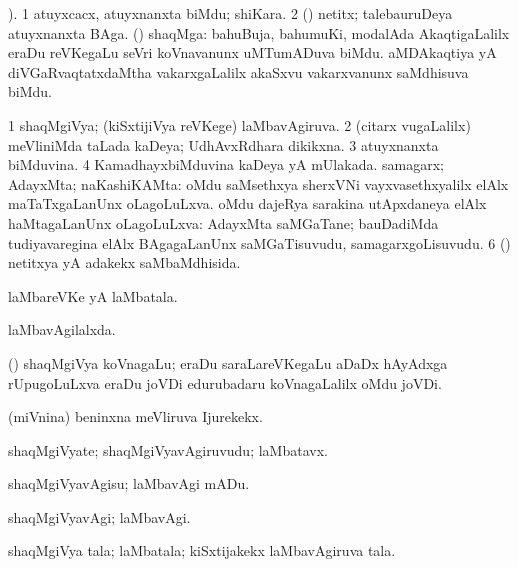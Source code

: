 \bentry
{} 
\gl{\nA}
). \bmng
\bnum
\num{1} atuyxcacx, atuyxnanxta biMdu; shiKara. 
\num{2} (\aMrashA) netitx; talebauruDeya atuyxnanxta BAga. 
 (\jAyx) shaqMga: 
\banum
{} bahuBuja, bahumuKi, modalAda AkaqtigaLalilx eraDu reVKegaLu seVri koVnavanunx uMTumADuva biMdu. 
 aMDAkaqtiya yA diVGaRvaqtatxdaMtha vakarxgaLalilx akaSxvu vakarxvanunx saMdhisuva biMdu. 
\eanum
\numie
\enum
\emng
\eentry

\bentry
{} 
\gl{\gu}
\expl{}
\bmng
\bnum
\num{1} shaqMgiVya; (kiSxtijiVya reVKege) laMbavAgiruva. 
\num{2} (citarx \mo vugaLalilx) meVliniMda taLada kaDeya; UdhAvxRdhara dikikxna. 
\num{3} atuyxnanxta biMduvina. 
\num{4} KamadhayxbiMduvina kaDeya yA mUlakada. 
 samagarx; AdayxMta; naKashiKAMta: 
\banum
{} oMdu saMsethxya sherxVNi vayxvasethxyalilx elAlx maTaTxgaLanUnx oLagoLuLxva. 
 oMdu dajeRya sarakina utApxdaneya elAlx haMtagaLanUnx oLagoLuLxva:  AdayxMta saMGaTane; bauDadiMda tudiyavaregina elAlx BAgagaLanUnx saMGaTisuvudu, samagarxgoLisuvudu. 
\eanum
\numie
\num{6} (\aMrashA) netitxya yA adakekx saMbaMdhisida. 
\enum
\emng
\eentry

\bentry
{} 
\gl{\nA}
\bmng
laMbareVKe yA laMbatala. 
\emng

\noindent 
\gl{\pagu}
\bmng
  laMbavAgilalxda. 
\emng
\eentry

\bentry
{}
\gl{\nA}
\bmng
 (\ga) shaqMgiVya koVnagaLu; eraDu saraLareVKegaLu aDaDx hAyAdxga rUpugoLuLxva eraDu joVDi edurubadaru koVnagaLalilx oMdu joVDi. 
\emng
\eentry

\bentry
{}
\gl{\nA}
\bmng
 (miVnina) beninxna meVliruva Ijurekekx. 
\emng
\eentry

\bentry
{}
\gl{\nA}
\expl{}
\bmng
 shaqMgiVyate; shaqMgiVyavAgiruvudu; laMbatavx. 
\emng
\eentry

\bentry
{} 
\gl{\sakirx}
\expl{}
\bmng
 shaqMgiVyavAgisu; laMbavAgi mADu. 
\emng
\eentry

\bentry
{} 
\gl{\kirxvi}
\expl{}
\bmng
 shaqMgiVyavAgi; laMbavAgi. 
\emng
\eentry

\bentry
{} 
\gl{\nA}
\expl{}
\bmng
 shaqMgiVya tala; laMbatala; kiSxtijakekx laMbavAgiruva tala. 
\emng
\eentry

